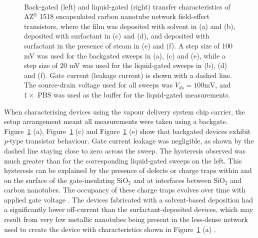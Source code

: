 \documentclass[
  a4paper,
]{scrbook}
\begin{document}
\begin{figure}
\begin{minipage}[t]{0.45\linewidth}
{{}

}

\end{minipage}%
%
\begin{minipage}[t]{0.01\linewidth}

{\centering 

~

}

\end{minipage}%

\caption[Back-gated and liquid-gated transfer characteristics of
encapsulated carbon nanotube network field-effect transistors with
thin-films deposited using various
methods.]{\label{fig-pristine-cnt-characteristics}Back-gated (left) and
liquid-gated (right) transfer characteristics of AZ\(^\circledR\) 1518
encapsulated carbon nanotube network field-effect transistors, where the
film was deposited with solvent in (a) and (b), deposited with
surfactant in (c) and (d), and deposited with surfactant in the presence
of steam in (e) and (f). A step size of 100 mV was used for the
backgated sweeps in (a), (c) and (e), while a step size of 20 mV was
used for the liquid-gated sweeps in (b), (d) and (f). Gate current
(leakage current) is shown with a dashed line. The source-drain voltage
used for all sweeps was \(V_{ds} = 100 \textrm{mV}\), and \(1 \times\)
PBS was used as the buffer for the liquid-gated measurements.}

\end{figure}

When characterising devices using the vapour delivery system chip
carrier, the setup arrangement meant all measurements were taken using a
backgate. Figure~\ref{fig-pristine-cnt-characteristics} (a),
Figure~\ref{fig-pristine-cnt-characteristics} (c) and
Figure~\ref{fig-pristine-cnt-characteristics} (e) show that backgated
devices exhibit \emph{p}-type transistor behaviour. Gate current leakage
was negligible, as shown by the dashed line staying close to zero across
the sweep. The hysteresis observed was much greater than for the
corresponding liquid-gated sweeps on the left. This hysteresis can be
explained by the presence of defects or charge traps within and on the
surface of the gate-insulating SiO\(_2\) and at interfaces between
SiO\(_2\) and carbon nanotubes. The occupancy of these charge traps
evolves over time with applied gate voltage
\autocite{Lee2007,Lee2012,Ha2014}. The devices fabricated with a
solvent-based deposition had a significantly lower off-current than the
surfactant-deposited devices, which may result from very few metallic
nanotubes being present in the less-dense network used to create the
device with characteristics shown in
Figure~\ref{fig-pristine-cnt-characteristics} (a) \autocite{Rouhi2011}.
\end{document}
